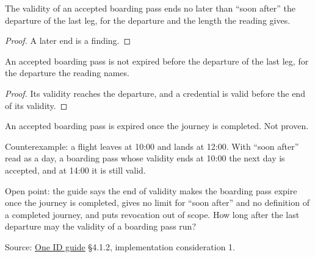 \begin{theorem}
  \label{thm:validity-ends-soon-after}
  The validity of an accepted boarding pass ends no later than ``soon after''
  the departure of the last leg, for the departure and the length the reading
  gives.
\end{theorem}
\begin{proof}
  A later end is a finding.
\end{proof}

\begin{theorem}
  \label{thm:valid-before-departure}
  An accepted boarding pass is not expired before the departure of the last
  leg, for the departure the reading names.
\end{theorem}
\begin{proof}
  Its validity reaches the departure, and a credential is valid before the
  end of its validity.
\end{proof}

\begin{theorem}
  \label{thm:expired-once-journey-completed}
  An accepted boarding pass is expired once the journey is completed.  Not
  proven.

  Counterexample: a flight leaves at 10:00 and lands at 12:00.  With ``soon
  after'' read as a day, a boarding pass whose validity ends at 10:00 the next
  day is accepted, and at 14:00 it is still valid.

  Open point: the guide says the end of validity makes the boarding pass
  expire once the journey is completed, gives no limit for ``soon after'' and
  no definition of a completed journey, and puts revocation out of scope.  How
  long after the last departure may the validity of a boarding pass run?

  Source: \href{https://standards.atlassian.net/wiki/spaces/OneID/pages/2947416082/Technical+Implementation+Guide}{One ID guide} §4.1.2, implementation consideration 1.
\end{theorem}

